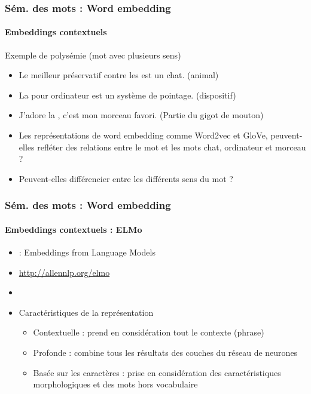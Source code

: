 \documentclass[xcolor=table]{beamer}
\begin{document}
\begin{frame}
\frametitle{Sém. des mots : Word embedding}
\framesubtitle{Embeddings contextuels}

\begin{exampleblock}{Exemple de polysémie (mot avec plusieurs sens)}
	\begin{itemize}
		\item Le meilleur préservatif contre les  est un chat. (animal)
		\item La  pour ordinateur est un système de pointage. (dispositif)
		\item J'adore la , c'est mon morceau favori. (Partie du gigot de mouton)
	\end{itemize}
\end{exampleblock}

\begin{itemize}
	\item Les représentations de word embedding comme Word2vec et GloVe, peuvent-elles refléter des relations entre le mot  et les mots chat, ordinateur et morceau ?
	\item Peuvent-elles différencier entre les différents sens du mot  ?
\end{itemize}

\end{frame}

\begin{frame}
\frametitle{Sém. des mots : Word embedding}
\framesubtitle{Embeddings contextuels : ELMo}

\begin{minipage}{.65\textwidth}
\begin{itemize}
	\item {} : Embeddings from Language Models
	\item \url{http://allennlp.org/elmo}
	\item \cite{2018-peters-al}
	\item Caractéristiques de la représentation
	\begin{itemize}
		\item Contextuelle :  prend en considération tout le contexte (phrase)
		\item Profonde : combine tous les résultats des couches du réseau de neurones
		\item Basée sur les caractères : prise en considération des caractéristiques morphologiques et des mots hors vocabulaire
	\end{itemize}
\end{itemize}
\end{minipage}
\begin{minipage}{.33\textwidth}
	\vspace{2cm}
\end{minipage}
	
\end{frame}
\end{document}
